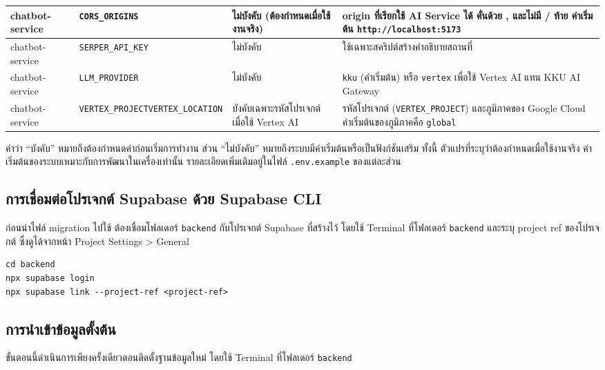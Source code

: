 {\begin{longtable}{|L{1.9cm}|L{4.5cm}|L{2.0cm}|L{4.4cm}|}
\hline
chatbot-service & \texttt{CORS\_ORIGINS} & ไม่บังคับ (ต้องกำหนดเมื่อใช้งานจริง) & origin ที่เรียกใช้ AI Service ได้ คั่นด้วย , และไม่มี / ท้าย ค่าเริ่มต้น \texttt{http://}\allowbreak\texttt{localhost:5173} \\
\hline
chatbot-service & \texttt{SERPER\_API\_KEY} & ไม่บังคับ & ใช้เฉพาะสคริปต์สร้างคำอธิบายสถานที่ \\
\hline
chatbot-service & \texttt{LLM\_PROVIDER} & ไม่บังคับ & \texttt{kku} (ค่าเริ่มต้น) หรือ \texttt{vertex} เพื่อใช้ Vertex AI แทน KKU AI Gateway \\
\hline
chatbot-service & \texttt{VERTEX\_PROJECT}\newline\texttt{VERTEX\_LOCATION} & บังคับเฉพาะรหัสโปรเจกต์ เมื่อใช้ Vertex AI & รหัสโปรเจกต์ (\texttt{VERTEX\_}\allowbreak\texttt{PROJECT}) และภูมิภาคของ Google Cloud ค่าเริ่มต้นของภูมิภาคคือ \texttt{global} \\
\hline
\end{longtable}
}

คำว่า ``บังคับ'' หมายถึงต้องกำหนดค่าก่อนเริ่มการทำงาน ส่วน ``ไม่บังคับ'' หมายถึงระบบมีค่าเริ่มต้นหรือเป็นฟังก์ชันเสริม ทั้งนี้ ตัวแปรที่ระบุว่าต้องกำหนดเมื่อใช้งานจริง ค่าเริ่มต้นของระบบเหมาะกับการพัฒนาในเครื่องเท่านั้น รายละเอียดเพิ่มเติมอยู่ในไฟล์ \texttt{.env.example} ของแต่ละส่วน

\subsection{การเชื่อมต่อโปรเจกต์ Supabase ด้วย Supabase CLI}

ก่อนนำไฟล์ migration ไปใช้ ต้องเชื่อมโฟลเดอร์ \texttt{backend} กับโปรเจกต์ Supabase ที่สร้างไว้ โดยใช้ Terminal ที่โฟลเดอร์ \texttt{backend} และระบุ project ref ของโปรเจกต์ ซึ่งดูได้จากหน้า Project Settings > General

\begin{codeblock}
\begin{lstlisting}[numbers=none]
cd backend
npx supabase login
npx supabase link --project-ref <project-ref>
\end{lstlisting}
\end{codeblock}

\subsection{การนำเข้าข้อมูลตั้งต้น}

ขั้นตอนนี้ดำเนินการเพียงครั้งเดียวตอนติดตั้งฐานข้อมูลใหม่ โดยใช้ Terminal ที่โฟลเดอร์ \texttt{backend}

